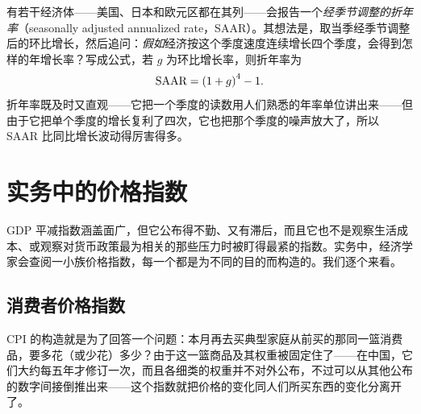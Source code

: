 
有若干经济体——美国、日本和欧元区都在其列——会报告一个\emph{经季节调整的折年率}（seasonally adjusted annualized rate，SAAR）。其想法是，取当季经季节调整后的环比增长，然后追问：\emph{假如}经济按这个季度速度连续增长四个季度，会得到怎样的年增长率？写成公式，若 $g$ 为环比增长率，则折年率为
\[
\text{SAAR} = \left(1+g\right)^{4} - 1 .
\]
折年率既及时又直观——它把一个季度的读数用人们熟悉的年率单位讲出来——但由于它把单个季度的增长复利了四次，它也把那个季度的噪声放大了，所以 SAAR 比同比增长波动得厉害得多。


\section{实务中的价格指数}

GDP 平减指数涵盖面广，但它公布得不勤、又有滞后，而且它也不是观察生活成本、或观察对货币政策最为相关的那些压力时被盯得最紧的指数。实务中，经济学家会查阅一小族价格指数，每一个都是为不同的目的而构造的。我们逐个来看。

\subsection{消费者价格指数}


CPI 的构造就是为了回答一个问题：本月再去买典型家庭从前买的那同一篮消费品，要多花（或少花）多少？由于这一篮商品及其权重被固定住了——在中国，它们大约每五年才修订一次，而且各细类的权重并不对外公布，不过可以从其他公布的数字间接倒推出来——这个指数就把价格的变化同人们所买东西的变化分离开了。

